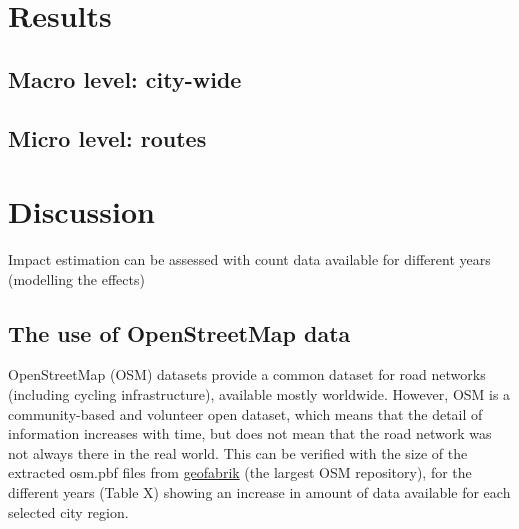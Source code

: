 \documentclass[
  sn-nature,
]{sn-jnl}
\begin{document}
\section{Results}\label{results}

\subsection{Macro level: city-wide}\label{macro-level-city-wide}

\subsection{Micro level: routes}\label{micro-level-routes}

\section{Discussion}\label{discussion}

Impact estimation can be assessed with count data available for
different years (modelling the effects)

\subsection{The use of OpenStreetMap
data}\label{the-use-of-openstreetmap-data}

OpenStreetMap (OSM) datasets provide a common dataset for road networks
(including cycling infrastructure), available mostly worldwide. However,
OSM is a community-based and volunteer open dataset, which means that
the detail of information increases with time, but does not mean that
the road network was not always there in the real world. This can be
verified with the size of the extracted osm.pbf files from
\href{https://www.geofabrik.de/}{geofabrik} (the largest OSM
repository), for the different years (Table X) showing an increase in
amount of data available for each selected city region.
\end{document}
